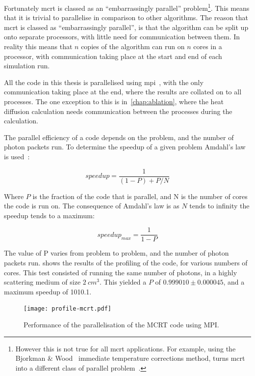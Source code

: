 Fortunately \gls*{mcrt} is classed as an ``embarrassingly parallel'' problem\footnote{However this is not true for all \gls*{mcrt} applications. For example, using the Bjorkman $\&$ Wood~\cite{bjorkman2001radiative} immediate temperature corrections method, turns \gls*{mcrt} into a different class of parallel problem~\cite{robitaille2011hyperion}.}.
This means that it is trivial to parallelise in comparison to other algorithms. 
The reason that \gls*{mcrt} is classed as ``embarrassingly parallel'', is that the algorithm can be split up onto separate processors, with little need for communication between them. 
In reality this means that $n$ copies of the algorithm can run on $n$ cores in a processor, with communication taking place at the start and end of each simulation run. 

All the code in this thesis is parallelised using \gls*{mpi}~\cite{gropp2014using,gropp2014usingadv}, with the only communication taking place at the end, where the results are collated on to all processes.
The one exception to this is in~\cref{chap:ablation}, where the heat diffusion calculation needs communication between the processes during the calculation.

The parallel efficiency of a code depends on the problem, and the number of photon packets run.
To determine the speedup of a given problem Amdahl's law is used~\cite{amdahl1967validity}:

\begin{equation}
speedup = \frac{1}{(1-P)+P/N}
\end{equation}

Where $P$ is the fraction of the code that is parallel, and N is the number of cores the code is run on.
The consequence of Amdahl's law is as $N$ tends to infinity the speedup tends to a maximum:

\begin{equation}
speedup_{max}=\frac{1}{1-P}
\end{equation}

The value of P varies from problem to problem, and the number of photon packets run.
 shows the results of the profiling of the code, for various numbers of cores.
This test consisted of running the same number of photons, in a highly scattering medium of size $2~cm^3$.
This yielded a $P$ of $0.999010 \pm 0.000045$, and a maximum speedup of 1010.1.


\begin{figure}[!ht]
	\centering
	\texttt{[image: profile-mcrt.pdf]}
	\caption{Performance of the parallelisation of the MCRT code using MPI.}
	\label{fig:paratest}
\end{figure}


